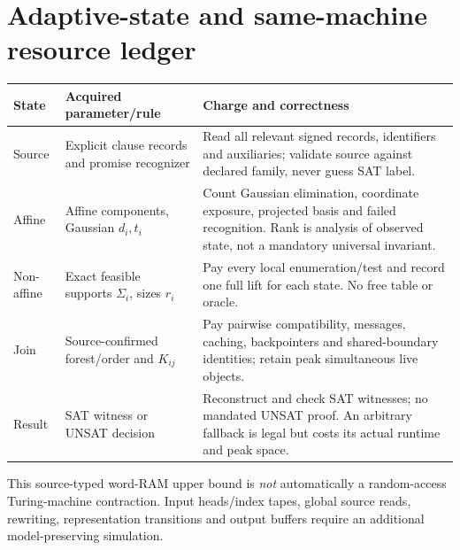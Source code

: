 \documentclass[11pt]{article}
\begin{document}
\section{Adaptive-state and same-machine resource ledger}
\begin{center}\small
\begin{tabular}{p{.14\linewidth}p{.31\linewidth}p{.42\linewidth}}
\toprule
State & Acquired parameter/rule & Charge and correctness \\
\midrule
Source & Explicit clause records and promise recognizer &
Read all relevant signed records, identifiers and auxiliaries; validate
source against declared family, never guess SAT label.\\
Affine & Affine components, Gaussian \(d_i,t_i\) &
Count Gaussian elimination, coordinate exposure, projected basis
and failed recognition. Rank is analysis of observed state, not a
mandatory universal invariant.\\
Non-affine & Exact feasible supports \(\Sigma_i\), sizes \(r_i\) &
Pay every local enumeration/test and record one full lift for each
state. No free table or oracle.\\
Join & Source-confirmed forest/order and \(K_{ij}\) &
Pay pairwise compatibility, messages, caching, backpointers and
shared-boundary identities; retain peak simultaneous live objects.\\
Result & SAT witness or UNSAT decision &
Reconstruct and check SAT witnesses; no mandated UNSAT proof.
An arbitrary fallback is legal but costs its actual runtime and
peak space.\\
\bottomrule
\end{tabular}
\end{center}
This source-typed word-RAM upper bound is \emph{not} automatically a
random-access Turing-machine contraction. Input heads/index tapes,
global source reads, rewriting, representation transitions and
output buffers require an additional model-preserving simulation.
\end{document}
